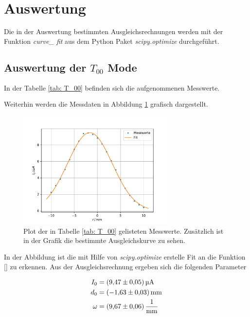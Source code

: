 \section{Auswertung}

Die in der Auswertung bestimmten Ausgleichsrechnungen werden mit
der Funktion \emph{curve\_ fit} \cite{scipy} aus dem Python Paket \emph{scipy.optimize}\cite{scipy} durchgeführt.

\subsection{Auswertung der $T_{00}$ Mode}
\FloatBarrier
In der Tabelle \ref{tab: T_00} befinden sich die aufgenommenen Messwerte.

Weiterhin werden die Messdaten in Abbildung \ref{fig: T_00} grafisch dargestellt.
\begin{figure}[h!]
  \centering
  \includegraphics[width=0.7\textwidth]{../Messdaten/plots/T_00.pdf}
  \caption{Plot der in Tabelle \ref{tab: T_00} gelisteten Messwerte. Zusätzlich ist in der Grafik die bestimmte Ausgleichskurve zu sehen.}
  \label{fig: T_00}
\end{figure}
In der Abbildung ist die mit Hilfe von \emph{scipy.optimize} erstelle Fit an die Funktion \eqref{} zu erkennen.
Aus der Ausgleichsrechnung ergeben sich die folgenden Parameter

\begin{align}
  \label{eq: fit_t_00}
  \begin{aligned}
  I_0&=\SI{9.47 \pm 0.05}{\micro\ampere}\\
  d_0&=\SI{-1.63\pm 0.03}{\milli\meter}\\
  \omega&=\SI{9.67\pm0.06}{\per\milli\meter}
\end{aligned}
\end{align}
\FloatBarrier
